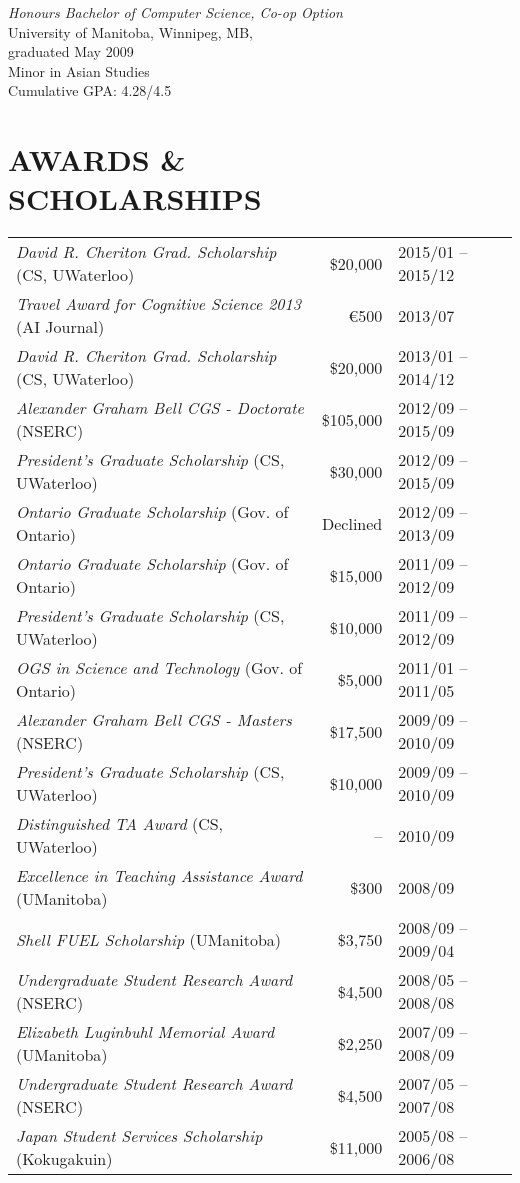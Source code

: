 \documentclass[line,margin]{res}
\begin{document}
\begin{resume}
{\sl Honours Bachelor of Computer Science, Co-op Option} \\
University of Manitoba, Winnipeg, MB, \\
graduated May 2009 \\
Minor in Asian Studies \\
Cumulative GPA: 4.28/4.5

\section{AWARDS \& \\ SCHOLARSHIPS}

\hspace{-1.4em}\begin{tabular}{lrl}
{\sl David R. Cheriton Grad. Scholarship} (CS, UWaterloo) &
\$20,000 & 2015/01 -- 2015/12\\
{\sl Travel Award for Cognitive Science 2013} (AI Journal) &
\euro{}500 & 2013/07 \\
{\sl David R. Cheriton Grad. Scholarship} (CS, UWaterloo) &
\$20,000 & 2013/01 -- 2014/12\\
{\sl Alexander Graham Bell CGS - Doctorate} (NSERC) &
\$105,000 & 2012/09 -- 2015/09 \\
{\sl President's Graduate Scholarship} (CS, UWaterloo) &
\$30,000 & 2012/09 -- 2015/09 \\
{\sl Ontario Graduate Scholarship} (Gov. of Ontario) &
Declined & 2012/09 -- 2013/09 \\
{\sl Ontario Graduate Scholarship} (Gov. of Ontario) &
\$15,000 & 2011/09 -- 2012/09 \\
{\sl President's Graduate Scholarship} (CS, UWaterloo) &
\$10,000 & 2011/09 -- 2012/09 \\
{\sl OGS in Science and Technology} (Gov. of Ontario) &
\$5,000 & 2011/01 -- 2011/05 \\
{\sl Alexander Graham Bell CGS - Masters} (NSERC) &
\$17,500 & 2009/09 -- 2010/09 \\
{\sl President's Graduate Scholarship} (CS, UWaterloo) &
\$10,000 & 2009/09 -- 2010/09 \\
{\sl Distinguished TA Award} (CS, UWaterloo) &
-- & 2010/09 \\
{\sl Excellence in Teaching Assistance Award} (UManitoba) &
\$300 & 2008/09 \\
{\sl Shell FUEL Scholarship} (UManitoba) &
\$3,750 & 2008/09 -- 2009/04 \\
{\sl Undergraduate Student Research Award} (NSERC) &
\$4,500 & 2008/05 -- 2008/08 \\
{\sl Elizabeth Luginbuhl Memorial Award} (UManitoba) &
\$2,250 & 2007/09 -- 2008/09 \\
{\sl Undergraduate Student Research Award} (NSERC) &
\$4,500 & 2007/05 -- 2007/08 \\
{\sl Japan Student Services Scholarship} (Kokugakuin) &
\$11,000 & 2005/08 -- 2006/08
\end{tabular}


\end{resume}
\end{document}
